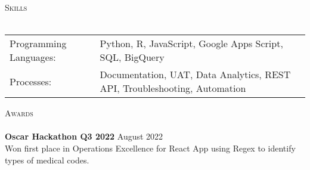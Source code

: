 \documentclass[a4paper]{article}
\newcommand{\lineunder} {
    \vspace*{-8pt} \\
    \hspace*{-18pt} \hrulefill \\
}
\newcommand{\header} [1] {
    {\hspace*{-18pt}\vspace*{6pt} \textsc{#1}}
    \vspace*{-6pt} \lineunder
}
\begin{document}
\header{Skills}
\begin{tabular}{ l l }
	Programming Languages: & Python, R, JavaScript, Google Apps Script, SQL, BigQuery\\
    Processes: & Documentation, UAT, Data Analytics, REST API, Troubleshooting, Automation\\
\end{tabular}
\vspace{2mm}


\header{Awards}
\textbf{Oscar Hackathon Q3 2022} \hfill August 2022\\
Won first place in Operations Excellence for React App using Regex to identify types of medical codes. 
\vspace*{2mm}

\ 
\end{document}
